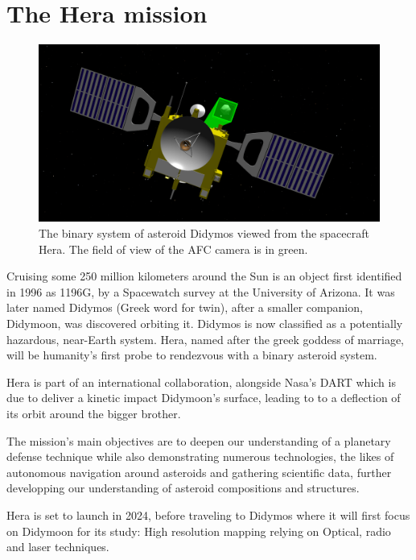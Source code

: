 \section{The Hera mission}
\label{intro}

\begin{figure}[b]
    \centering
    \includegraphics[width=\linewidth]{rsc/hera_didymos.png}
    \caption{The binary system of asteroid Didymos viewed from the spacecraft Hera. The field of view of the AFC camera is in green.}
    \label{fig:1.1}
\end{figure}

Cruising some 250 million kilometers around the Sun is an object first identified in 1996 as 1196G, by a Spacewatch survey at the  University of Arizona. It was later named Didymos (Greek word for twin), after a smaller companion, Didymoon, was discovered orbiting it. Didymos is now classified  as a potentially hazardous, near-Earth system. 
Hera, named after the greek goddess of marriage, will be humanity's first probe to rendezvous with a binary asteroid system. 

Hera is part of an international collaboration, alongside Nasa's DART which is due to deliver a kinetic impact Didymoon's surface, leading to to a deflection of its orbit around the bigger brother.  

The mission's main objectives are to deepen our understanding of a planetary defense technique while also demonstrating numerous technologies, the likes of autonomous navigation around asteroids and gathering scientific data, further developping our understanding of asteroid compositions and structures. 

Hera is set to launch in 2024, before traveling to Didymos where it will first focus on Didymoon for its study: High resolution mapping relying on Optical, radio and laser techniques. 

